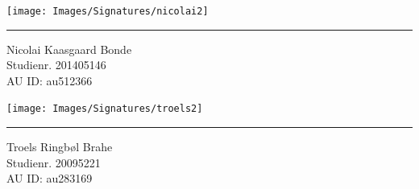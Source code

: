 \begin{titlingpage}
\begin{center}
			\begin{minipage}{0.40\linewidth}
				\centering
				\texttt{[image: Images/Signatures/nicolai2]}
				\hrule
				\vspace{12pt}
				Nicolai Kaasgaard Bonde\\
				Studienr. 201405146\\
				AU ID: au512366
			\end{minipage}
			\hspace{50pt}
			\begin{minipage}{0.40\linewidth}
				\centering
				\texttt{[image: Images/Signatures/troels2]}
				\hrule
				\vspace{12pt}
				Troels Ringbøl Brahe\\
				Studienr. 20095221\\
				AU ID: au283169
			\end{minipage}
	\end{center}
\end{titlingpage}